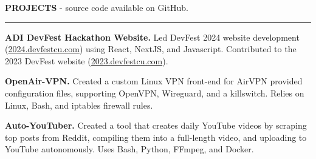 \documentclass[11pt,letterpaper]{article}
\begin{document}

\medskip
\MakeUppercase{{\bf Projects}} - source code available on GitHub.
\medskip
\hrule
\begin{list}{}{\setlength{\leftmargin}{0em}}
    \item
          \vspace{-1.25em}

    \item \textbf{ADI DevFest Hackathon Website.} {Led DevFest 2024 website development
    (\href{https://2024.devfestcu.com/}{2024.devfestcu.com})} using React, NextJS, and Javascript.
    Contributed to the 2023 DevFest website (\href{https://2023.devfestcu.com/}{2023.devfestcu.com}).
              
    \item \textbf{OpenAir-VPN.} {Created a custom Linux VPN front-end for AirVPN provided configuration files, supporting OpenVPN, Wireguard, and a killswitch. Relies on Linux, Bash, and iptables firewall rules. }

    \item \textbf{Auto-YouTuber.} {Created a tool that creates daily YouTube videos by scraping top posts from Reddit, compiling them into a full-length video, and uploading to YouTube autonomously. Uses Bash, Python, FFmpeg, and Docker. }

\end{list}


\end{document}
